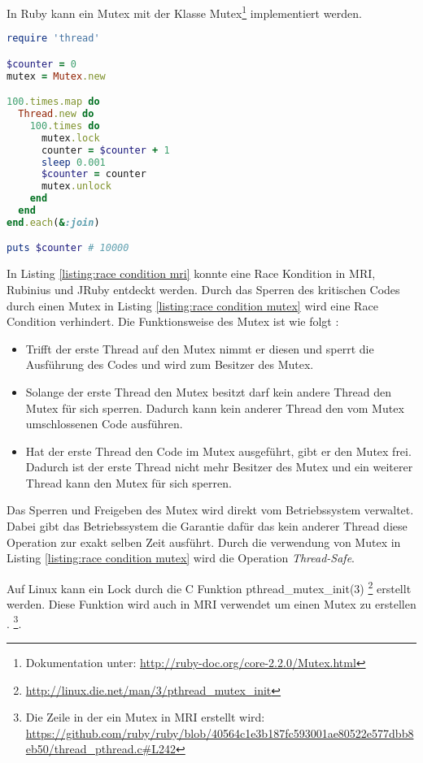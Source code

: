 In Ruby kann ein Mutex mit der Klasse Mutex\footnote{Dokumentation unter:  \url{http://ruby-doc.org/core-2.2.0/Mutex.html}} implementiert werden.


\begin{lstlisting}[language=Ruby,label={listing:race condition mutex}]
require 'thread'

$counter = 0
mutex = Mutex.new

100.times.map do
  Thread.new do
    100.times do
      mutex.lock
      counter = $counter + 1
      sleep 0.001
      $counter = counter
      mutex.unlock
    end
  end
end.each(&:join)

puts $counter # 10000
\end{lstlisting}

In Listing \ref{listing:race condition mri} konnte eine Race Kondition in MRI, Rubinius und JRuby entdeckt werden. Durch das Sperren des kritischen Codes durch einen Mutex in Listing \ref{listing:race condition mutex} wird eine Race Condition verhindert. Die Funktionsweise des Mutex ist wie folgt \cite[p. 83-84]{Sto2013}: 

\begin{itemize}
  \item Trifft der erste Thread auf den Mutex nimmt er diesen und sperrt die Ausführung des Codes und wird zum Besitzer des Mutex.
  \item Solange der erste Thread den Mutex besitzt darf kein andere Thread den Mutex für sich sperren. Dadurch kann kein anderer Thread den vom Mutex umschlossenen Code ausführen. 
  \item Hat der erste Thread den Code im Mutex ausgeführt, gibt er den Mutex frei. Dadurch ist der erste Thread nicht mehr Besitzer des Mutex und ein weiterer Thread kann den Mutex für sich sperren.
\end{itemize}

Das Sperren und Freigeben des Mutex wird direkt vom Betriebssystem verwaltet. Dabei gibt das Betriebssystem die Garantie dafür das kein anderer Thread diese Operation zur exakt selben Zeit ausführt. Durch die verwendung von Mutex in Listing \ref{listing:race condition mutex} wird die Operation \emph{Thread-Safe}.

Auf Linux kann ein Lock durch die C Funktion pthread\_mutex\_init(3) \footnote{\url{http://linux.die.net/man/3/pthread_mutex_init}} erstellt werden. Diese Funktion wird auch in MRI verwendet um einen Mutex zu erstellen \cite[p. 83-84]{Sto2013}. \footnote{Die Zeile in der ein Mutex in MRI erstellt wird: \url{https://github.com/ruby/ruby/blob/40564c1e3b187fc593001ae80522e577dbb8eb50/thread_pthread.c#L242}}.

